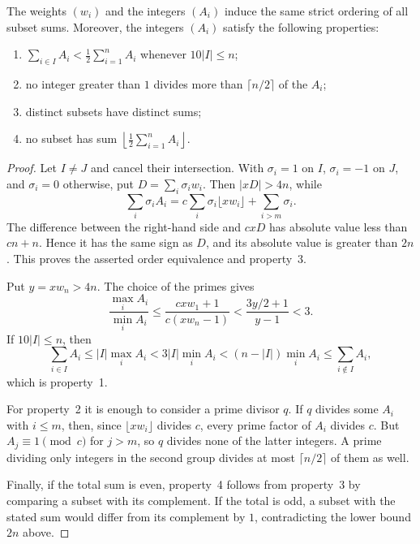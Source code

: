 \documentclass[10pt,a4paper]{amsart}
\newcommand{\abs}[1]{\lvert#1\rvert}
\begin{document}
\begin{proposition}\label{prop:chvatal}
The weights $(w_i)$ and the integers $(A_i)$ induce the same strict ordering
of all subset sums.  Moreover, the integers $(A_i)$ satisfy the following
properties:
\begin{enumerate}
 \item $\sum_{i\in I}A_i<\frac12\sum_{i=1}^n A_i$ whenever
       $10\abs I\leq n$;
 \item no integer greater than $1$ divides more than $\lceil n/2\rceil$ of
       the $A_i$;
 \item distinct subsets have distinct sums;
 \item no subset has sum $\left\lfloor\frac12\sum_{i=1}^nA_i\right\rfloor$.
\end{enumerate}
\end{proposition}

\begin{proof}
Let $I\neq J$ and cancel their intersection.  With
$\sigma_i=1$ on $I$, $\sigma_i=-1$ on $J$, and $\sigma_i=0$ otherwise, put
$D=\sum_i\sigma_iw_i$.  Then $\abs{xD}>4n$, while
\[
 \sum_i\sigma_iA_i
 =c\sum_i\sigma_i\lfloor xw_i\rfloor
   +\sum_{i>m}\sigma_i.
\]
The difference between the right-hand side and $cxD$ has absolute value less
than $cn+n$.  Hence it has the same sign as $D$, and its absolute value is
greater than $2n$.  This proves the asserted order equivalence and property~3.

Put $y=xw_n>4n$.  The choice of the primes gives
\[
 \frac{\max_i A_i}{\min_i A_i}
 \leq\frac{cxw_1+1}{c(xw_n-1)}
 <\frac{3y/2+1}{y-1}<3.
\]
If $10\abs I\leq n$, then
\[
 \sum_{i\in I}A_i
 \leq\abs I\max_iA_i
 <3\abs I\min_iA_i
 <(n-\abs I)\min_iA_i
 \leq\sum_{i\notin I}A_i,
\]
which is property~1.

For property~2 it is enough to consider a prime divisor $q$.  If $q$ divides
some $A_i$ with $i\leq m$, then, since
$\lfloor xw_i\rfloor$ divides $c$, every prime factor of $A_i$ divides $c$.
But $A_j\equiv1\pmod c$ for $j>m$, so $q$ divides none of the latter
integers.  A prime dividing only integers in the second group divides at most
$\lceil n/2\rceil$ of them as well.

Finally, if the total sum is even, property~4 follows from property~3 by
comparing a subset with its complement.  If the total is odd, a subset with
the stated sum would differ from its complement by $1$, contradicting the
lower bound $2n$ above.
\end{proof}
\end{document}
